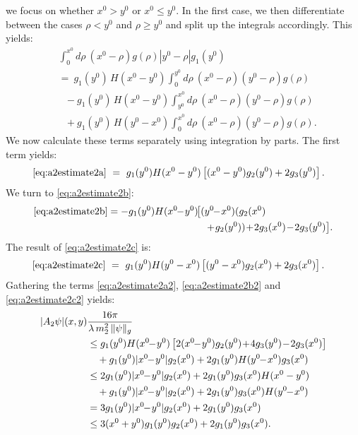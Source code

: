 \documentclass[b5paper,draft,openbib,12pt]{memoir}
\begin{document}
we focus on whether $x^0>y^0$ or $x^0\leq y^0$. In the first case, we then 
differentiate between the cases $\rho < y^0$ and $\rho \geq y^0$ and split 
up the integrals accordingly. This yields:
\begin{align}
	 &\int_0^{x^0} d \rho~(x^0-\rho) g(\rho) |y^0-\rho| g_1(y^0)\nonumber\\
&=~ g_1(y^0)\, H(x^0-y^0) \int_0^{y^0} d \rho~(x^0-\rho)(y^0-\rho) g(\rho)\label{eq:a2estimate2a}\\
&~~~ - g_1(y^0)\, H(x^0-y^0) \int_{y^0}^{x^0} d \rho~(x^0-\rho)(y^0-\rho) g(\rho)\label{eq:a2estimate2b}\\
& ~~~+ g_1(y^0)\, H(y^0-x^0) \int_0^{x^0} d \rho~(x^0-\rho)(y^0-\rho) g(\rho).
\label{eq:a2estimate2c}
\end{align}
We now calculate these terms separately using integration by parts. The first 
term yields:
\begin{align}
	\eqref{eq:a2estimate2a} ~&=~ g_1(y^0) H(x^0-y^0) \left[ (x^0-y^0) g_2(y^0)+ 2g_3(y^0)\right].
\label{eq:a2estimate2a2}
\end{align}
We turn to \eqref{eq:a2estimate2b}:
\begin{align}\notag
  \eqref{eq:a2estimate2b} = -g_1(y^0) H(x^0\!\!-\!y^0)\!&\big[ (y^0\!\!-\!x^0)(g_2(x^0)\\
  &\quad \!+\!g_2(y^0))\!+\!2g_3(x^0) \!-\! 2g_3(y^0)\big].
\label{eq:a2estimate2b2}
\end{align}
The result of \eqref{eq:a2estimate2c} is:
\begin{align}
	\eqref{eq:a2estimate2c} ~&=~ g_1(y^0) H(y^0-x^0) \left[ (y^0-x^0) g_2(x^0)+ 2g_3(x^0)\right].
	\label{eq:a2estimate2c2}
\end{align}
Gathering the terms \eqref{eq:a2estimate2a2}, \eqref{eq:a2estimate2b2} and 
\eqref{eq:a2estimate2c2} yields:
\begin{align}
  |A_2 \psi|(x,y)& \frac{16\pi}{\lambda \, m_2^2 \, \| \psi \|_g} \notag\\
  &\leq g_1(y^0) H(x^0\!\!-\!y^0) \left[ 2(x^0\!\!-\!y^0)g_2(y^0) \!+\! 4 g_3(y^0)\!-\!2g_3(x^0) \right]\nonumber\\
&~~~+g_1(y^0) |x^0\!\!-\!y^0| g_2(x^0) + 2 g_1(y^0) H(y^0\!\!-\!x^0) g_3(x^0)\nonumber\\
&\leq 2g_1(y^0)|x^0\!\!-\!y^0| g_2(x^0) + 2 g_1(y^0)g_3(x^0) H(x^0-y^0)\nonumber\\
&~~~+g_1(y^0)|x^0\!\!-\!y^0|g_2(x^0) + 2 g_1(y^0) g_3(x^0) H(y^0\!\!-\!x^0)\nonumber\\
&= 3g_1(y^0)|x^0\!\!-\!y^0| g_2(x^0) + 2 g_1(y^0)g_3(x^0)\nonumber\\
&\leq 3(x^0+y^0)g_1(y^0) g_2(x^0) + 2 g_1(y^0)g_3(x^0).
\end{align}
\end{document}
